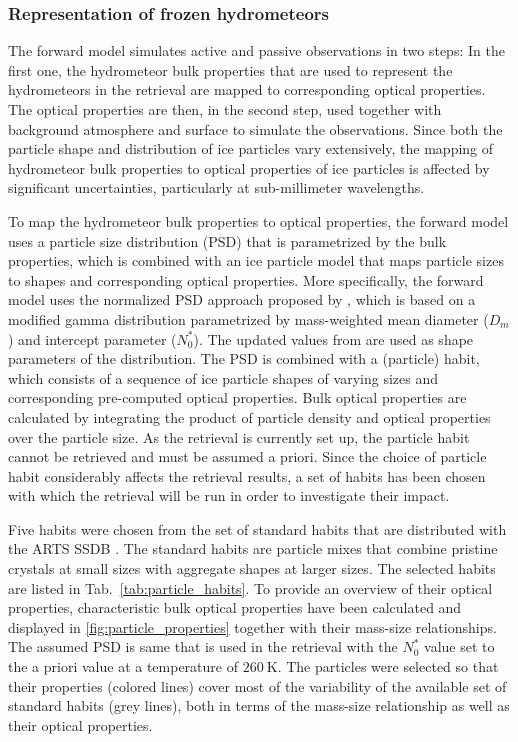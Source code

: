 \documentclass[journal abbreviation, manuscript]{copernicus}
\begin{document}
\subsubsection{Representation of frozen hydrometeors}

The forward model simulates active and passive observations in two steps: In the
first one, the hydrometeor bulk properties that are used to represent the
hydrometeors in the retrieval are mapped to corresponding optical properties.
The optical properties are then, in the second step, used together with
background atmosphere and surface to simulate the observations. Since both the
particle shape and distribution of ice particles vary extensively, the mapping
of hydrometeor bulk properties to optical properties of ice particles is
affected by significant uncertainties, particularly at sub-millimeter
wavelengths.

To map the hydrometeor bulk properties to optical properties, the forward model
uses a particle size distribution (PSD) that is parametrized by the bulk
properties, which is combined with an ice particle model that maps particle
sizes to shapes and corresponding optical properties. More specifically, the
forward model uses the normalized PSD approach proposed by \citet{delanoe05},
which is based on a modified gamma distribution parametrized by mass-weighted
mean diameter ($D_m$) and intercept parameter ($N_0^*$). The updated values from
\citet{cazenave19} are used as shape parameters of the distribution. The PSD is
combined with a (particle) habit, which consists of a sequence of ice particle
shapes of varying sizes and corresponding pre-computed optical properties. Bulk
optical properties are calculated by integrating the product of particle density
and optical properties over the particle size. As the retrieval is currently set
up, the particle habit cannot be retrieved and must be assumed a priori. Since
the choice of particle habit considerably affects the retrieval results, a
set of habits has been chosen with which the retrieval will be run in order to
investigate their impact.

Five habits were chosen from the set of standard habits that are distributed
with the ARTS SSDB \citep{eriksson18}. The standard habits are particle mixes
that combine pristine crystals at small sizes with aggregate shapes at larger
sizes. The selected habits are listed in Tab.~\ref{tab:particle_habits}. To
provide an overview of their optical properties, characteristic bulk optical
properties have been calculated and displayed in \ref{fig:particle_properties}
together with their mass-size relationships. The assumed PSD is same that is
used in the retrieval with the $N_0^*$ value set to the a priori value at a
temperature of $\SI{260}{\kelvin}$. The particles were selected so that their
properties (colored lines) cover most of the variability of the available set of
standard habits (grey lines), both in terms of the mass-size relationship as
well as their optical properties.
\end{document}
